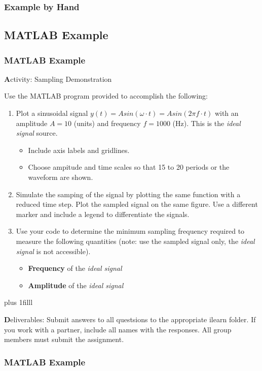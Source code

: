 \documentclass[fleqn]{beamer} %
\newcommand{\sectionIIIsubsectionIIItitle}{Example by Hand}
\newcommand{\sectionIIIsubsectionIVtitle}{MATLAB Example}
\newcommand{\btVFill}{\vskip0pt plus 1filll}
\begin{document}
			\begin{frame}
				\frametitle{\sectionIIIsubsectionIIItitle}



			\end{frame}

		\subsection{\sectionIIIsubsectionIVtitle}\label{sectionIIIsubsectionIV}	

			\begin{frame}
				\frametitle{\sectionIIIsubsectionIVtitle}
				\bigskip

				{\textbf Activity: Sampling Demonstration}

				Use the MATLAB program provided to accomplish the following:

				\begin{enumerate} \tiny

					\item Plot a sinusoidal signal $y(t)=Asin(\omega\cdot t)=Asin(2\pi f \cdot t)$ with an amplitude $A=10$ (units) and frequency $f=1000$ (Hz). This is the {\it ideal signal} source. 
					\begin{itemize} \tiny
						\item Include axis labels and gridlines. 
						\item Choose ampitude and time scales so that 15 to 20 periods or the waveform are shown. \vspace{5mm}\\
					\end{itemize} 
					\item Simulate the samping of the signal by plotting the same function with a reduced time step. Plot the sampled signal on the same figure. Use a different marker and include a legend to differentiate the signals. \vspace{5mm}\\ 

					\item Use your code to determine the minimum sampling frequency required to measure the following quantities (note: use the sampled signal only, the {\it ideal signal} is not accessible).	

					\begin{itemize} \tiny
						\item {\bf Frequency} of the {\it ideal signal}
						\item {\bf Amplitude} of the {\it ideal signal}
					\end{itemize}



				\end{enumerate}

				\btVFill

				\tiny
				{\textbf Deliverables: Submit answers to all questsions to the appropriate ilearn folder. If you work with a partner, include all names with the responses. All group members must submit the assignment.}
			
			\end{frame}

			\begin{frame}
				\frametitle{\sectionIIIsubsectionIVtitle}
				


			\end{frame}
\end{document}
